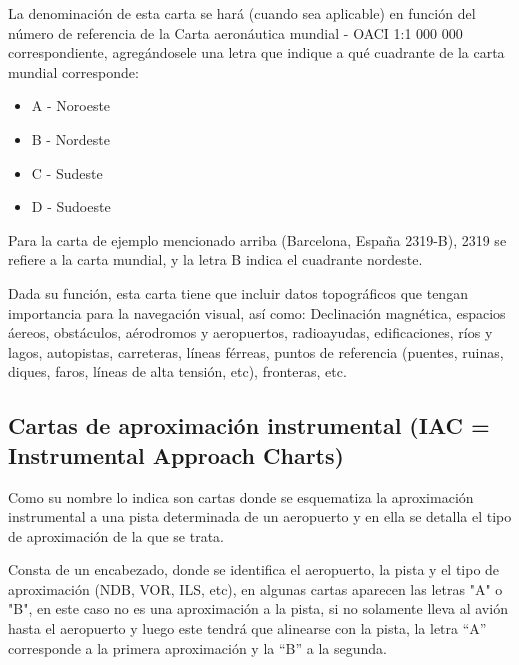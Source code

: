 \documentclass[a4paper,12pt,twoside]{article}
\begin{document}
La denominaci\'on de esta carta se har\'a (cuando sea aplicable) en funci\'on del n\'umero de referencia de la Carta aeron\'autica mundial - OACI 1:1 000 000 correspondiente, agreg\'andosele una letra que indique a qu\'e cuadrante de la carta mundial corresponde:

\begin{multicols}{2}
  \begin{itemize}
  \item A - Noroeste

  \item B - Nordeste

  \item C - Sudeste

  \item D - Sudoeste
  \end{itemize}
\end{multicols}

Para la carta de ejemplo mencionado arriba (Barcelona, Espa\~na 2319-B), 2319 se refiere a la carta mundial, y la letra B indica el cuadrante nordeste.

Dada su funci\'on, esta carta tiene que incluir datos topogr\'aficos que tengan importancia para la navegaci\'on visual, as\'i como: Declinaci\'on magn\'etica, espacios \'aereos, obst\'aculos, a\'erodromos y aeropuertos, radioayudas, edificaciones, r\'ios y lagos, autopistas, carreteras, l\'ineas f\'erreas, puntos de referencia (puentes, ruinas, diques, faros, l\'ineas de alta tensi\'on, etc), fronteras, etc. 

\subsection{Cartas de aproximaci\'on instrumental (IAC = Instrumental Approach Charts)
}
\label{sec:cart-de-aproximacion}

Como su nombre lo indica son cartas donde se esquematiza la aproximaci\'on
instrumental a una pista determinada de un aeropuerto y en ella se detalla el
tipo de aproximaci\'on de la que se trata.

Consta de un encabezado, donde se identifica el aeropuerto, la pista y el tipo
de aproximaci\'on (NDB, VOR, ILS, etc), en algunas cartas aparecen las letras
"A" o "B", en este caso no es una aproximaci\'on a la pista, si no solamente
lleva al avi\'on hasta el aeropuerto y luego este tendr\'a que alinearse con la
pista, la letra ``A'' corresponde a la primera aproximaci\'on y la ``B'' a la
segunda.
\end{document}
